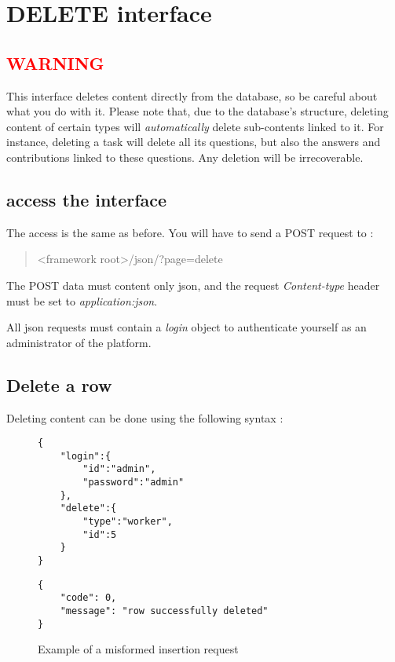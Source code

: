 \documentclass[notitlepage]{report}
\begin{document}
\chapter{DELETE interface}
\section{\textcolor{red}{WARNING}}
This interface deletes content directly from the database, so be careful about what you do with it. Please note that, due to the database's structure, deleting content of certain types will \emph{automatically} delete sub-contents linked to it. For instance, deleting a task will delete all its questions, but also the answers and contributions linked to these questions. Any deletion will be irrecoverable. 
\section{access the interface}
The access is the same as before. You will have to send a POST request to : 
\begin{quote}<framework root>/json/?page=delete\end{quote}
The POST data must content only json, and the request \emph{Content-type} header must be set to \emph{application:json}.

All json requests must contain a \emph{login} object to authenticate yourself as an administrator of the platform.
\section{Delete a row}
Deleting content can be done using the following syntax :
\begin{figure}[h]
\centering
\begin{minipage}{.45\linewidth}
\begin{verbatim}
{
    "login":{   
        "id":"admin",
        "password":"admin"
    },
    "delete":{
        "type":"worker",
        "id":5
    }
}
\end{verbatim}
\end{minipage}
\begin{minipage}{.45\linewidth}
\begin{verbatim}
{
    "code": 0,
    "message": "row successfully deleted"
}
\end{verbatim}
\end{minipage}
\caption{Example of a misformed insertion request}
\end{figure}
\end{document}
